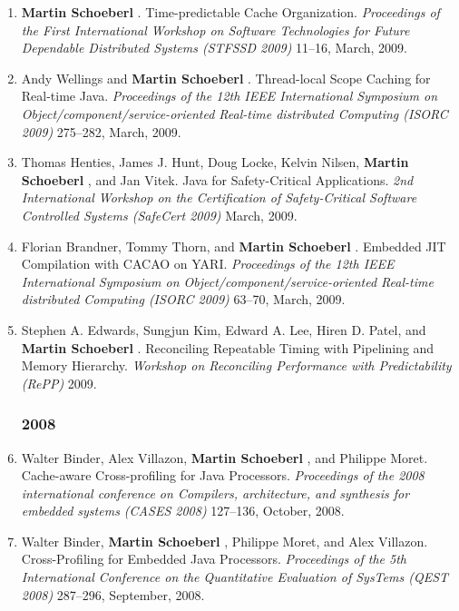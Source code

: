 \begin{enumerate}
\item {\bf Martin Schoeberl }.
 Time-predictable Cache Organization.
 \emph{Proceedings of the First International Workshop on Software Technologies for Future Dependable Distributed Systems (STFSSD 2009)} 11--16, March, 2009.

\item Andy Wellings and {\bf Martin Schoeberl }.
 Thread-local Scope Caching for Real-time Java.
 \emph{Proceedings of the 12th IEEE International Symposium on Object/component/service-oriented Real-time distributed Computing (ISORC 2009)} 275--282, March, 2009.

\item Thomas Henties, James J. Hunt, Doug Locke, Kelvin Nilsen, {\bf Martin Schoeberl }, and Jan Vitek.
 Java for Safety-Critical Applications.
 \emph{2nd International Workshop on the Certification of Safety-Critical Software Controlled Systems (SafeCert 2009)} March, 2009.

\item Florian Brandner, Tommy Thorn, and {\bf Martin Schoeberl }.
 Embedded JIT Compilation with CACAO on YARI.
 \emph{Proceedings of the 12th IEEE International Symposium on Object/component/service-oriented Real-time distributed Computing (ISORC 2009)} 63--70, March, 2009.

\item Stephen A. Edwards, Sungjun Kim, Edward A. Lee, Hiren D. Patel, and {\bf Martin Schoeberl }.
 Reconciling Repeatable Timing with Pipelining and Memory Hierarchy.
 \emph{Workshop on Reconciling Performance with Predictability (RePP)} 2009.


\subsubsection*{2008}

\item Walter Binder, Alex Villazon, {\bf Martin Schoeberl }, and Philippe Moret.
 Cache-aware Cross-profiling for Java Processors.
 \emph{Proceedings of the 2008 international conference on Compilers, architecture, and synthesis for embedded systems (CASES 2008)} 127--136, October, 2008.

\item Walter Binder, {\bf Martin Schoeberl }, Philippe Moret, and Alex Villazon.
 Cross-Profiling for Embedded Java Processors.
 \emph{Proceedings of the 5th International Conference on the Quantitative Evaluation of SysTems (QEST 2008)} 287--296, September, 2008.


\end{enumerate}
